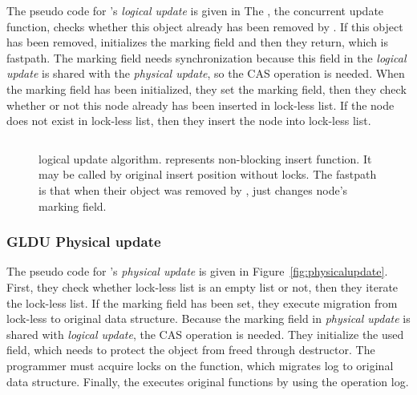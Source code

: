 The pseudo code for 's \emph{logical update} is given in
The , the concurrent update function, checks whether this
object already has been removed by .
If this object has been removed,  initializes the marking
 field and then they return, which is fastpath.
The marking field needs synchronization because this field in the
\emph{logical update} is shared with the \emph{physical update}, so the CAS
 operation is needed.
When the marking field has been initialized, they set the
marking field, then they check whether or not this node already has been
 inserted in lock-less list.
If the node does not exist in lock-less list, then they insert the node into
lock-less list.

\begin{figure}[tb!]
 
\inputminted[linenos,fontsize=\footnotesize, tabsize=2]{c}{src/ldu_logical.c}

\caption{ logical update algorithm.  represents
 non-blocking insert function.
It may be called by original insert position without locks. The fastpath is
 that when their object was removed by ,
  just changes node's marking field.}
\label{fig:gldulogicalupdate}
\end{figure}


\subsubsection{GLDU Physical update}

The pseudo code for 's \emph{physical update} is given in
Figure~\ref{fig:physicalupdate}.
First, they check whether lock-less list is an empty list or not, then they
iterate the lock-less list.
If the marking field has been set, they execute migration from
lock-less to original data structure.
Because the marking field in \emph{physical update} is shared with
 \emph{logical update}, the CAS operation is needed.
They initialize the used field, which needs to protect the object from freed
 through destructor.
The programmer must acquire locks on the  function,
which migrates log to original data structure.
Finally, the  executes original functions by using the
operation log.

